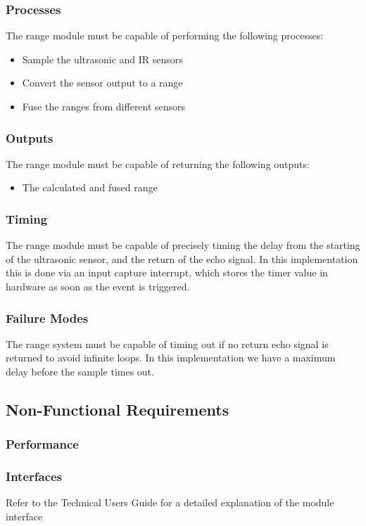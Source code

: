 \documentclass[]{report}
\begin{document}
\subsubsection{Processes}
The range module must be capable of performing the following processes:
\begin{itemize}
	\item Sample the ultrasonic and IR sensors
	\item Convert the sensor output to a range
	\item Fuse the ranges from different sensors
\end{itemize}

\subsubsection{Outputs}
The range module must be capable of returning the following outputs:
\begin{itemize}
	\item The calculated and fused range
\end{itemize}

\subsubsection{Timing}

The range module must be capable of precisely timing the delay from the starting of the ultrasonic sensor, and the return of the echo signal. In this implementation this is done via an input capture interrupt, which stores the timer value in hardware as soon as the event is triggered.

\subsubsection{Failure Modes}
The range system must be capable of timing out if no return echo signal is returned to avoid infinite loops. In this implementation we have a maximum delay before the sample times out.

\subsection{Non-Functional Requirements}
\subsubsection{Performance}

\subsubsection{Interfaces}
Refer to the Technical Users Guide for a detailed explanation of the module interface
\end{document}
